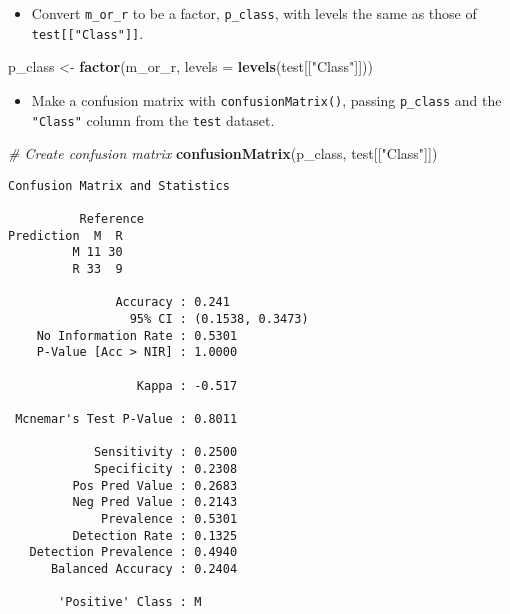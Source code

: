 \documentclass[]{book}
\newenvironment{Shaded}{\begin{snugshade}}{\end{snugshade}}
\newcommand{\KeywordTok}[1]{\textcolor[rgb]{0.13,0.29,0.53}{\textbf{#1}}}
\newcommand{\DataTypeTok}[1]{\textcolor[rgb]{0.13,0.29,0.53}{#1}}
\newcommand{\StringTok}[1]{\textcolor[rgb]{0.31,0.60,0.02}{#1}}
\newcommand{\CommentTok}[1]{\textcolor[rgb]{0.56,0.35,0.01}{\textit{#1}}}
\newcommand{\NormalTok}[1]{#1}
\providecommand{\tightlist}{%
  \setlength{\itemsep}{0pt}\setlength{\parskip}{0pt}}
\begin{document}
\begin{itemize}
\tightlist
\item
  Convert \texttt{m\_or\_r} to be a factor, \texttt{p\_class}, with
  levels the same as those of \texttt{test{[}{[}"Class"{]}{]}}.
\end{itemize}

\begin{Shaded}
\begin{Highlighting}[]
\NormalTok{p_class <-}\StringTok{ }\KeywordTok{factor}\NormalTok{(m_or_r, }\DataTypeTok{levels =} \KeywordTok{levels}\NormalTok{(test[[}\StringTok{"Class"}\NormalTok{]]))}
\end{Highlighting}
\end{Shaded}

\begin{itemize}
\tightlist
\item
  Make a confusion matrix with \texttt{confusionMatrix()}, passing
  \texttt{p\_class} and the \texttt{"Class"} column from the
  \texttt{test} dataset.
\end{itemize}

\begin{Shaded}
\begin{Highlighting}[]
\CommentTok{# Create confusion matrix}
\KeywordTok{confusionMatrix}\NormalTok{(p_class, test[[}\StringTok{"Class"}\NormalTok{]])}
\end{Highlighting}
\end{Shaded}

\begin{verbatim}
Confusion Matrix and Statistics

          Reference
Prediction  M  R
         M 11 30
         R 33  9
                                          
               Accuracy : 0.241           
                 95% CI : (0.1538, 0.3473)
    No Information Rate : 0.5301          
    P-Value [Acc > NIR] : 1.0000          
                                          
                  Kappa : -0.517          
                                          
 Mcnemar's Test P-Value : 0.8011          
                                          
            Sensitivity : 0.2500          
            Specificity : 0.2308          
         Pos Pred Value : 0.2683          
         Neg Pred Value : 0.2143          
             Prevalence : 0.5301          
         Detection Rate : 0.1325          
   Detection Prevalence : 0.4940          
      Balanced Accuracy : 0.2404          
                                          
       'Positive' Class : M               
                                          
\end{verbatim}
\end{document}
